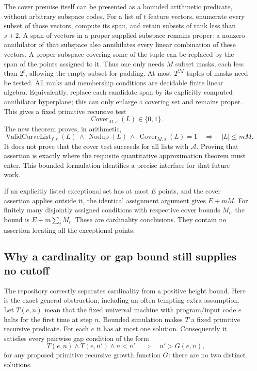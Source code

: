 The cover premise itself can be presented as a bounded arithmetic
predicate, without arbitrary subspace codes. For a list of $t$ feature
vectors, enumerate every subset of those vectors, compute its span,
and retain subsets of rank less than $s+2$. A span of vectors in a
proper supplied subspace remains proper: a nonzero annihilator of that
subspace also annihilates every linear combination of these vectors. A proper subspace
covering some of the tuple can be replaced by the span of the
points assigned to it. Thus one only needs $M$ subset masks, each
less than $2^t$, allowing the empty subset for padding. At most
$2^{tM}$ tuples of masks need be tested. All ranks and membership
conditions are decidable finite linear algebra. Equivalently,
replace each candidate span by its explicitly computed annihilator
hyperplane; this can only enlarge a covering set and remains proper.
This gives a fixed primitive recursive test
\[
       \operatorname{Cover}_{M,s}(L)\in\{0,1\}.
\]
The new theorem proves, in arithmetic,
\[
 \operatorname{ValidCurveList}_{f,r}(L)\ \wedge\
 \operatorname{Nodup}(L)\ \wedge\
 \operatorname{Cover}_{M,s}(L)=1
       \quad\Longrightarrow\quad |L|\le mM.
\]
It does not prove that the cover test succeeds for all lists with
$\mathcal A$. Proving that assertion is exactly where the requisite
quantitative approximation theorem must enter. This bounded
formulation identifies a precise interface for that future work.

If an explicitly listed exceptional set has at most $E$ points,
and the cover assertion applies outside it, the identical assignment
argument gives $E+mM$. For finitely many disjointly assigned
conditions with respective cover bounds $M_i$, the bound is
$E+m\sum_i M_i$. These are cardinality conclusions. They contain
no assertion locating all the exceptional points.

\subsection{Why a cardinality or gap bound still supplies no cutoff}

The repository correctly separates cardinality from a positive
height bound. Here is the exact general obstruction, including an
often tempting extra assumption. Let $T(e,n)$ mean that the fixed
universal machine with program/input code $e$ halts for the first
time at step $n$. Bounded simulation makes $T$ a fixed primitive
recursive predicate. For each $e$ it has at most one solution.
Consequently it satisfies every pairwise gap condition of the form
\[
 T(e,n)\wedge T(e,n')\wedge n<n'
             \quad\Longrightarrow\quad n'>G(e,n),
\]
for any proposed primitive recursive growth function $G$: there
are no two distinct solutions.

